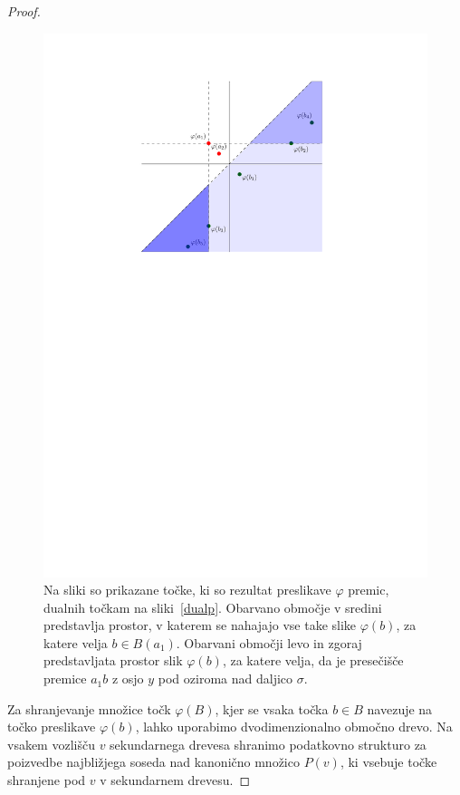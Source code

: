 \documentclass[a4paper, 12pt]{book}
\begin{document}
\begin{proof}
\begin{figure}
\centerline{\includegraphics[scale=1]{pics/dual_problem4.pdf}}
\caption{Na sliki so prikazane točke, ki so rezultat preslikave $\varphi$ premic, dualnih točkam na sliki~\ref{dualp}. Obarvano območje v sredini predstavlja prostor, v katerem se nahajajo vse take slike $\varphi (b)$, za katere velja $b \in B(a_1)$. Obarvani območji levo in zgoraj predstavljata prostor slik $\varphi (b)$, za katere velja, da je presečišče premice $a_1b$ z osjo $y$ pod oziroma nad daljico $\sigma$.} 
\label{dualp2}
\end{figure}

Za shranjevanje množice točk $\varphi(B)$, kjer se vsaka točka $b \in B$ navezuje na točko preslikave $\varphi(b)$, lahko uporabimo dvodimenzionalno območno drevo. Na vsakem vozlišču $v$ sekundarnega drevesa shranimo podatkovno strukturo za poizvedbe najbližjega soseda nad kanonično množico $P(v)$, ki vsebuje točke shranjene pod $v$ v sekundarnem drevesu. 


\end{proof}
\end{document}
